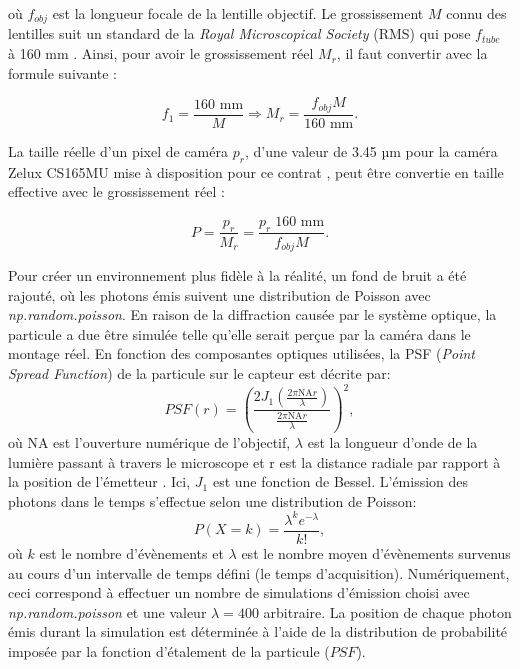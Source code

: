 \documentclass[conference]{IEEEtran}
\begin{document}
où $f_{obj}$ est la longueur focale de la lentille objectif. Le grossissement $M$ connu des lentilles suit
un standard de la \textit{Royal Microscopical Society} (RMS) qui pose $f_{tube}$ à 160 mm
\cite{RMS}. Ainsi, pour avoir le grossissement réel $M_{r}$, il faut convertir avec la 
formule suivante :


\begin{equation}\label{m_2}
  f_{1}= \frac{160 \text{ mm} }{M} \Rightarrow M_{r} = \frac{f_{obj}M}{160 \text{ mm} }.
\end{equation}

La taille réelle d'un pixel de caméra $p_r$, d'une valeur de 3.45 µm pour la caméra Zelux CS165MU
mise à disposition pour ce contrat \cite{thorlabs}, peut être convertie en taille effective
avec le grossissement réel :

\begin{equation}\label{pixel}
  P = \frac{p_{r}}{M_{r}} = \frac{p_{r}\;160 \text{ mm}}{f_{obj}M}.
\end{equation}

Pour créer un environnement plus fidèle à la réalité, un fond de bruit
a été rajouté, où les photons émis suivent une distribution de Poisson avec \textit{np.random.poisson}. En raison de la diffraction 
causée par le système optique, la particule a due être simulée
telle qu'elle serait perçue par la caméra dans le montage réel. En fonction des composantes optiques utilisées,
la PSF (\textit{Point Spread Function}) de la particule sur le capteur est décrite par:
\begin{equation}
  PSF(r)=\left(\frac{2J_1(\frac{2\pi \text{NA}r}{\lambda})}{\frac{2\pi \text{NA}r}{\lambda}}\right)^2,
\end{equation}
où NA est l'ouverture numérique de l'objectif, $\lambda$ est la longueur d'onde de la lumière passant à travers
le microscope et r est la distance radiale par rapport à la position de l'émetteur \cite{procedurier}. Ici, $J_1$
est une fonction de Bessel. L'émission des photons dans le temps s'effectue selon une distribution de Poisson:
\begin{equation}
  P(X=k)=\frac{\lambda^k e^{-\lambda}}{k!},
\end{equation}
où $k$ est le nombre d'évènements et $\lambda$ est le nombre moyen d'évènements
survenus au cours d'un intervalle de temps défini (le temps d'acquisition). Numériquement, ceci correspond à effectuer un nombre de simulations
d'émission choisi avec \textit{np.random.poisson} et une valeur $\lambda=400$ arbitraire. La position de chaque photon
émis durant la simulation est déterminée à l'aide de la distribution de probabilité imposée par la fonction d'étalement 
de la particule ($PSF$).
\end{document}
